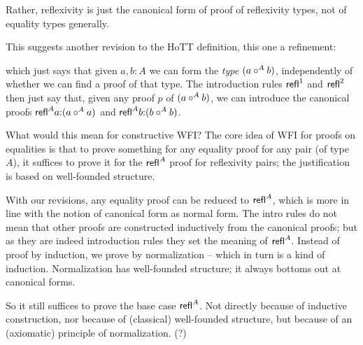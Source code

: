 \documentclass{article}
\begin{document}
Rather, reflexivity is just the canonical form of proof of reflexivity
types, not of equality types generally.

This suggests another revision to the HoTT definition, this one a refinement:

\medskip


\noindent which just says that given \(a,b{:}A\) we can form the
\emph{type} \(\reflAab\), independently of whether we can find a proof
of that type.  The introduction rules \(\refl{1}\) and \(\refl{2}\)
then just say that, given any proof \(p\) of \(\reln{A}{a}{b}\), we
can introduce the canonical proofs \(\refl{A}a{:}\reln{A}{a}{a}\) and
\(\refl{A}b{:}\reln{A}{b}{b}\).

\medskip

What would this mean for constructive WFI?  The core idea of WFI for
proofs on equalities is that to prove something for any equality proof
for any pair (of type \(A\)), it suffices to prove it for the
\(\refl{A}\) proof for reflexivity pairs; the justification is based
on well-founded structure.

With our revisions, any equality proof can be reduced to \(\refl{A}\),
which is more in line with the notion of canonical form as normal
form.  The intro rules do not mean that other proofs are constructed
inductively from the canonical proofs; but as they are indeed
introduction rules they set the meaning of \(\refl{A}\).  Instead of
proof by induction, we prove by normalization -- which in turn is a
kind of induction.  Normalization has well-founded structure; it
always bottoms out at canonical forms.

So it still suffices to prove the base case \(\refl{A}\).  Not
directly because of inductive construction, nor because of (classical)
well-founded structure, but because of an (axiomatic) principle of
normalization.  (?)
\end{document}
